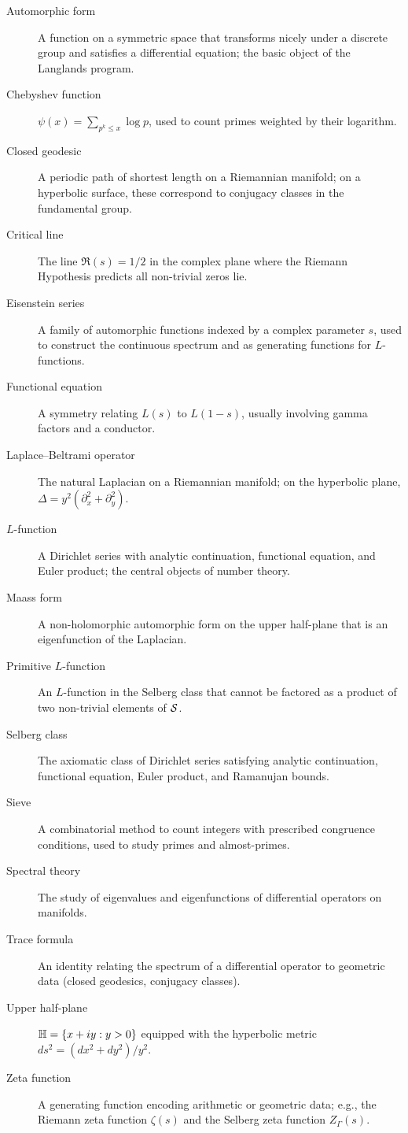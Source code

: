 \begin{description}
    \item[Automorphic form] A function on a symmetric space that transforms nicely under a discrete group and satisfies a differential equation; the basic object of the Langlands program.
    \item[Chebyshev function] \(\psi(x) = \sum_{p^k \leq x} \log p\), used to count primes weighted by their logarithm.
    \item[Closed geodesic] A periodic path of shortest length on a Riemannian manifold; on a hyperbolic surface, these correspond to conjugacy classes in the fundamental group.
    \item[Critical line] The line \(\Re(s) = 1/2\) in the complex plane where the Riemann Hypothesis predicts all non-trivial zeros lie.
    \item[Eisenstein series] A family of automorphic functions indexed by a complex parameter \(s\), used to construct the continuous spectrum and as generating functions for \(L\)-functions.
    \item[Functional equation] A symmetry relating \(L(s)\) to \(L(1-s)\), usually involving gamma factors and a conductor.
    \item[Laplace--Beltrami operator] The natural Laplacian on a Riemannian manifold; on the hyperbolic plane, \(\Delta = y^2(\partial_x^2 + \partial_y^2)\).
    \item[\(L\)-function] A Dirichlet series with analytic continuation, functional equation, and Euler product; the central objects of number theory.
    \item[Maass form] A non-holomorphic automorphic form on the upper half-plane that is an eigenfunction of the Laplacian.
    \item[Primitive \(L\)-function] An \(L\)-function in the Selberg class that cannot be factored as a product of two non-trivial elements of \(\mathcal{S}\).
    \item[Selberg class] The axiomatic class of Dirichlet series satisfying analytic continuation, functional equation, Euler product, and Ramanujan bounds.
    \item[Sieve] A combinatorial method to count integers with prescribed congruence conditions, used to study primes and almost-primes.
    \item[Spectral theory] The study of eigenvalues and eigenfunctions of differential operators on manifolds.
    \item[Trace formula] An identity relating the spectrum of a differential operator to geometric data (closed geodesics, conjugacy classes).
    \item[Upper half-plane] \(\mathbb{H} = \{x+iy : y > 0\}\) equipped with the hyperbolic metric \(ds^2 = (dx^2 + dy^2)/y^2\).
    \item[Zeta function] A generating function encoding arithmetic or geometric data; e.g., the Riemann zeta function \(\zeta(s)\) and the Selberg zeta function \(Z_\Gamma(s)\).
\end{description}

